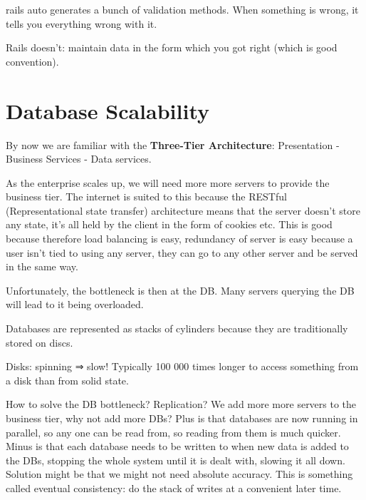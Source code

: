\documentclass[11pt]{article}
\begin{document}
rails auto generates a bunch of validation methods. When something is wrong, it tells you everything wrong with it.

Rails doesn’t: maintain data in the form  which you got right (which is good convention).


\section{Database Scalability}

By now we are familiar with the \textbf{Three-Tier Architecture}: Presentation - Business Services - Data services.

As the enterprise scales up, we will need more more servers to provide the business tier. The internet is suited to this because the RESTful (Representational state transfer) architecture means that the server doesn’t store any state, it’s all held by the client in the form of cookies etc. This is good because therefore load balancing is easy, redundancy of server is easy because a user isn’t tied to using any server, they can go to any other server and be served in the same way.

Unfortunately, the bottleneck is then at the DB. Many servers querying the DB will lead to it being overloaded.

Databases are represented as stacks of cylinders because they are traditionally stored on discs.

Disks: spinning ⇒ slow! Typically 100 000 times longer to access something from a disk than from solid state.

How to solve the DB bottleneck?
Replication? We add more more servers to the business tier, why not add more DBs? Plus is that databases are now running in parallel, so any one can be read from, so reading from them is much quicker. Minus is that each database needs to be written to when new data is added to the DBs, stopping the whole system until it is dealt with, slowing it all down. Solution might be that we might not need absolute accuracy. This is something called eventual consistency: do the stack of writes at a convenient later time.
\end{document}
